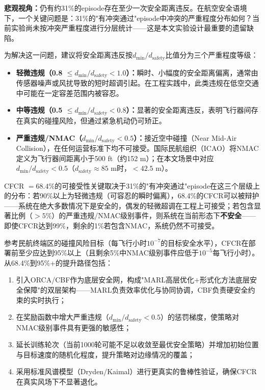 \documentclass[12pt,a4paper,UTF8]{ctexart}
\begin{document}
\textbf{悲观视角：}仍有约31\%的episode存在至少一次安全距离违反。在航空安全语境下，一个关键问题是：31\%的"有冲突通过"episode中冲突的严重程度分布如何？当前实验尚未按冲突严重程度进行分层统计——这是本文实验设计最重要的遗留缺陷。

为解决这一问题，建议将安全距离违反按$d_{\min}/d_{\text{safety}}$比值分为三个严重程度等级：

\begin{itemize}
    \item \textbf{轻微违规（0.8 $\leq d_{\min}/d_{\text{safety}} < 1.0$）：}瞬时、小幅度的安全距离偏离，通常由传感器噪声或风扰导致的短时超调引起。在工程实践中，此类违规在低空交通中可能在一定容差范围内被容忍。
    \item \textbf{中等违规（0.5 $\leq d_{\min}/d_{\text{safety}} < 0.8$）：}显著的安全距离违反，表明飞行器间存在真实的碰撞风险，但通过紧急机动仍可矫正。
    \item \textbf{严重违规/NMAC（$d_{\min}/d_{\text{safety}} < 0.5$）：}接近空中碰撞（Near Mid-Air Collision），在任何运营标准下均不可接受。国际民航组织（ICAO）将NMAC定义为飞行器间距离小于500 ft（约152 m）；在本文场景中对应$d_{\min}/d_{\text{safety}} < 0.5$（$d_{\text{safety}} \approx 85$ m时，$<42.5$ m）。
\end{itemize}

CFCR $= 68.4\%$的可接受性关键取决于31\%的"有冲突通过"episode在这三个层级上的分布：若90\%以上为轻微违规（可容忍的瞬时偏离），68.4\%的CFCR可以被辩护——系统在绝大多数情况下是安全的，偶发的轻微超调在工程上可接受；若包含显著比例（$>5\%$）的严重违规/NMAC级别事件，则系统在当前形态下\textbf{不安全}——即使CFCR达到99\%，剩余的1\%若包含NMAC，系统仍然不可接受。

参考民航终端区的碰撞风险目标（每飞行小时$10^{-7}$的目标安全水平），CFCR在部署前至少应达到95\%以上（且剩余5\%中NMAC级别事件应低于$10^{-5}$每飞行小时）。从68.4\%到95\%+的提升路径包括：
\begin{enumerate}[label=(\arabic*)]
    \item 引入ORCA/CBF作为底层安全网，构成"MARL高层优化$+$形式化方法底层安全保障"的双层架构——MARL负责效率优化与协同协调，CBF负责硬安全约束的实时执行；
    \item 在奖励函数中增大严重违规（$d_{\min}/d_{\text{safety}} < 0.5$）的惩罚梯度，使策略对NMAC级别事件具有更强的敏感性；
    \item 延长训练轮次（当前1000轮可能不足以收敛至最优安全策略）并增加初始位置与目标速度的随机化程度，提升策略对边缘情况的覆盖；
    \item 采用标准风谱模型（Dryden/Kaimal）进行更真实的鲁棒性验证，确保CFCR在真实风场下不显著退化。
\end{enumerate}
\end{document}
